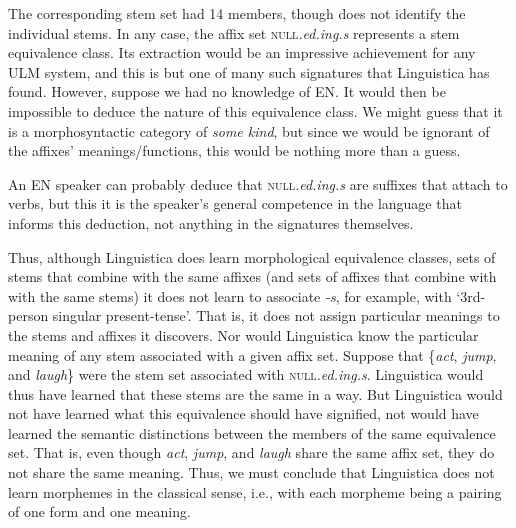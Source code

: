 The corresponding stem set had 14 members, though \cite{goldsmith:2001} 
does not identify the individual stems. 
In any case, the affix set \textsc{null}\textit{.ed.ing.s} represents 
a stem equivalence class. Its extraction would be an impressive achievement for any \ac{ULM}  system, and this
is but one of many such signatures that Linguistica has found. However, 
suppose we had no knowledge of \ac{EN}. It would then be impossible to deduce the nature 
of this equivalence class. We might
guess that it is a morphosyntactic category of \emph{some kind}, but since we would be ignorant
of the affixes' meanings/functions, this would be nothing more than a guess. 

An \ac{EN} speaker can probably deduce that \textsc{null}\textit{.ed.ing.s} are suffixes that attach to verbs,
but this it is the speaker's general competence in the language that informs this deduction, not anything in the 
signatures themselves. 

Thus, although Linguistica does learn morphological equivalence classes, 
sets of stems that combine with the same affixes 
(and sets of affixes that combine with with the same stems) 
it does not learn to associate \textit{-s}, for example, 
with `3rd-person singular present-tense'. That is, it does not assign particular
meanings to the stems and affixes it discovers.
Nor would Linguistica know the particular meaning of any stem 
associated with a given affix set. 
Suppose that \{\textit{act}, \emph{jump}, and \emph{laugh}\} 
were the stem set associated with \textsc{null}\textit{.ed.ing.s}. 
Linguistica would thus have learned that these stems are the same 
in a way. But Linguistica would not have learned what this 
equivalence should have signified, not would have learned the semantic 
distinctions between the members of the same equivalence set. 
That is, even though \textit{act}, \emph{jump}, and \emph{laugh} 
share the same affix set, they do not share the same meaning. 
Thus, we must conclude that Linguistica does not learn morphemes 
in the classical sense, i.e., with each morpheme being a
pairing of one form and one meaning.

